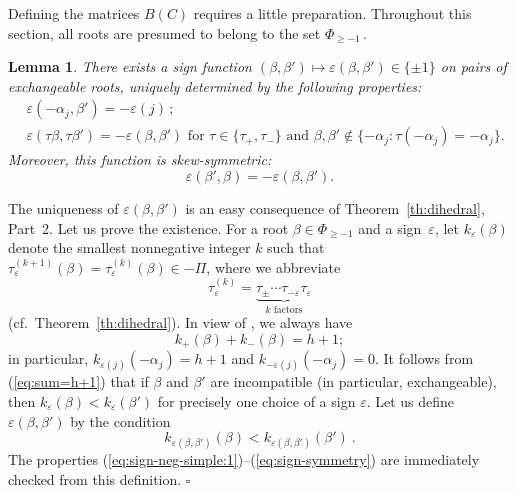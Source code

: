 \documentclass[letterpaper]{amsart}
\numberwithin{equation}{section}
\newtheorem{lemma}[theorem]{Lemma}
\theoremstyle{definition}
\def\proof{\smallskip\noindent {\bf Proof.\ }}
\def\endproof{\hfill$\square$\medskip}
\begin{document}
 
 
Defining the matrices $B(C)$ requires a little preparation. 
Throughout this section, all roots are presumed to belong to the set 
$\Phi_{\geq -1}\,$. 
 
\begin{lemma} 
\label{lem:sign-beta-beta'} 
There exists a sign function $(\beta, \beta') \mapsto 
\varepsilon(\beta, \beta')\in \{\pm 1\}$ on pairs of exchangeable roots, 
uniquely determined by the following properties: 
\begin{align} 
\label{eq:sign-neg-simple:1} 
&\varepsilon(- \alpha_j,\beta') = - \varepsilon (j)\,;\\ 
\label{eq:tau-sign} 
& \varepsilon(\tau \beta,\tau \beta')= - \varepsilon(\beta,\beta') 
\text{\ for $\tau\in\{\tau_+,\tau_-\}$ 
and $\beta,\beta' \notin 
\{-\alpha_j:\tau(-\alpha_j) =-\alpha_j\}$.} 
\end{align} 
Moreover, this function is skew-symmetric: 
\begin{equation} 
\label{eq:sign-symmetry} 
\varepsilon (\beta',\beta) = - \varepsilon(\beta, \beta'). 
\end{equation} 
\end{lemma} 
 
\proof 
The uniqueness of $\varepsilon (\beta, \beta')$ is an easy 
consequence of Theorem~\ref{th:dihedral}, Part~2. 
Let us prove the existence. 
For a root $\beta \in \Phi_{\geq -1}$ and a sign~$\varepsilon$, 
let $k_\varepsilon(\beta)$ denote 
the smallest nonnegative integer $k$ such that 
$%
\tau^{(k+1)}_\varepsilon (\beta) = 
\tau^{(k)}_\varepsilon (\beta) \in-\Pi 
$, %
where we abbreviate 
\[\tau^{(k)}_\varepsilon = 
\underbrace{\tau_{\pm} 
\cdots \tau_{-\varepsilon}\tau_\varepsilon}_{k \text{~factors}} 
\] 
(cf.\ Theorem~\ref{th:dihedral}). 
In view of %
\cite[Theorem~3.1]{cfz}, 
we always have 
\begin{equation} 
\label{eq:sum=h+1} 
k_+(\beta)+k_-(\beta)=h+1; 
\end{equation} 
in particular, 
$k_{\varepsilon(j)}(-\alpha_j)=h+1$ and 
$k_{-\varepsilon(j)}(-\alpha_j)=0$. 
It follows from (\ref{eq:sum=h+1}) that if $\beta$ and $\beta'$ are 
incompatible (in particular, exchangeable), then 
$k_\varepsilon (\beta) < k_\varepsilon (\beta')$ for precisely one 
choice of a sign $\varepsilon$. 
Let us define $\varepsilon(\beta,\beta')$ by the condition 
\begin{equation} 
\label{eq:k<k} 
k_{\varepsilon(\beta,\beta')} (\beta) < k_{\varepsilon(\beta,\beta')} (\beta') 
\ . 
\end{equation} 
The properties 
(\ref{eq:sign-neg-simple:1})--(\ref{eq:sign-symmetry}) are 
immediately checked from this definition. 
\endproof 
 
\end{document}
